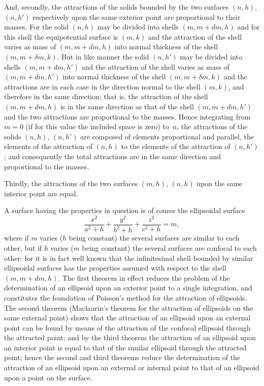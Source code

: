 \documentclass[11pt,a4paper]{book}
\begin{document}
And, secondly, the attractions of the solids bounded by the two surfaces $(n, h)$,
$(n, h')$ respectively upon the same exterior point are proportional to their masses.
For the solid $(n, h)$ may be divided into shells $(m, m+dm, h)$ and for this shell
the equipotential surface is $(m, k)$ and the attraction of the shell varies as mass of
$(m, m + dm, h)$ into normal thickness of the shell $(m, m+\delta m, k)$. But in like manner
the solid $(n, h')$ may be divided into shells $(m, m+dm, h')$ and the attraction of the
shell varies as mass of $(m, m + dm, h')$ into normal thickness of the shell $(m, m+\delta m, k)$
and the attractions are in each case in the direction normal to the shell $(m, k)$, and
therefore in the same direction; that is, the attraction of the shell $(m, m+dm, h)$
is in the same direction as that of the shell $(m, m + dm, h')$ and the two attractions
are proportional to the masses. Hence integrating from $m=0$ (if for this value the
included space is zero) to~$n$, the attractions of the solids $(n, h)$, $(n, h')$ are composed
of elements proportional and parallel, the elements of the attraction of $(n, h)$ to the
elements of the attraction of $(n, h')$; and consequently the total attractions are in the
same direction and proportional to the masses.

Thirdly, the attractions of the two surfaces $(m, h)$, $(n, h)$ upon the same interior
point are equal.

\smallskip

A surface having the properties in question is of course the ellipsoidal surface
\[
\frac{x^2}{a^2+h} + \frac{y^2}{b^2+h} + \frac{z^2}{c^2+h} = m,
\]
where if $m$ varies ($h$ being constant) the several surfaces are similar to each other,
but if $h$ varies ($m$ being constant) the several surfaces are confocal to each other: for
it is in fact well known that the infinitesimal shell bounded by similar ellipsoidal
surfaces has the properties assumed with respect to the shell $(m, m + dm, h)$. The
first theorem in effect reduces the problem of the determination of an ellipsoid upon
an exterior point to a single integration, and constitutes the foundation of Poisson's
method for the attraction of ellipsoids. The second theorem (Maclaurin's theorem for
the attraction of ellipsoids on the same external point) shows that the attraction of
an ellipsoid upon an external point can be found by means of the attraction of the
confocal ellipsoid through the attracted point; and by the third theorem the attraction
of an ellipsoid upon an interior point is equal to that of the similar ellipsoid through
the attracted point; hence the second and third theorems reduce the determination
of the attraction of an ellipsoid upon an external or internal point to that of an
ellipsoid upon a point on the surface.
\end{document}
